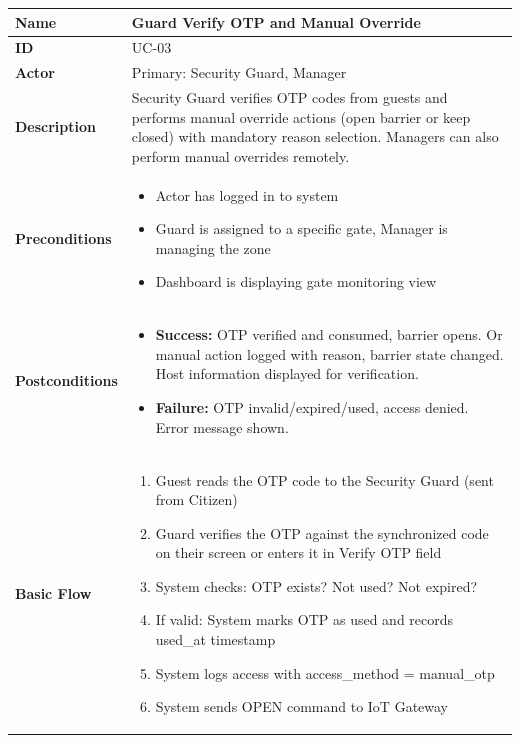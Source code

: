 \documentclass[a4paper]{article}
\newlength{\ucLeft}
\begin{document}
\begin{longtable}{|>{\bfseries}p{\ucLeft}|
                p{\dimexpr\textwidth-\ucLeft-4\tabcolsep-3\arrayrulewidth\relax}|}
\hline
Name & Guard Verify OTP and Manual Override\\ \hline
ID & UC-03 \\ \hline
Actor & Primary: Security Guard, Manager \\ \hline
Description & Security Guard verifies OTP codes from guests and performs manual override actions (open barrier or keep closed) with mandatory reason selection. Managers can also perform manual overrides remotely.\\ \hline
Preconditions &
\begin{itemize}[leftmargin=*, nosep, topsep=0pt, partopsep=0pt, parsep=0pt]
    \item Actor has logged in to system
    \item Guard is assigned to a specific gate, Manager is managing the zone
    \item Dashboard is displaying gate monitoring view
\end{itemize}
\\ \hline
Postconditions &
\begin{itemize}[leftmargin=*, nosep, topsep=0pt, partopsep=0pt, parsep=0pt, after=\strut]
    \item \textbf{Success:} OTP verified and consumed, barrier opens. Or manual action logged with reason, barrier state changed. Host information displayed for verification.
    \item \textbf{Failure:} OTP invalid/expired/used, access denied. Error message shown.
\end{itemize}
\\ \hline
Basic Flow & 
\begin{enumerate}[leftmargin=*, nosep, topsep=0pt, partopsep=0pt, parsep=0pt]
    \item Guest reads the OTP code to the Security Guard (sent from Citizen)
    \item Guard verifies the OTP against the synchronized code on their screen or enters it in Verify OTP field
    \item System checks: OTP exists? Not used? Not expired?
    \item If valid: System marks OTP as used and records used\_at timestamp
    \item System logs access with access\_method = manual\_otp
    \item System sends OPEN command to IoT Gateway

\end{enumerate}
\end{longtable}
\end{document}
